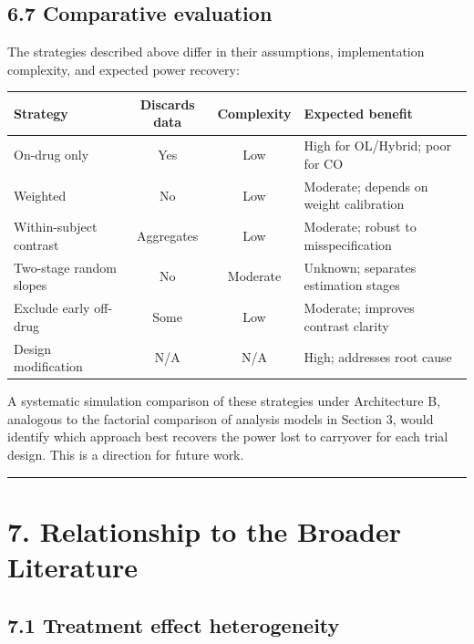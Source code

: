 \documentclass[11pt]{article}
\begin{document}
\subsection{6.7 Comparative evaluation}

The strategies described above differ in their assumptions,
implementation complexity, and expected power recovery:

\begin{table}[htbp]
\centering
\begin{tabular}{lccp{5cm}}
\toprule
Strategy & Discards data & Complexity & Expected benefit \\
\midrule
On-drug only & Yes & Low & High for OL/Hybrid; poor for CO \\
Weighted & No & Low & Moderate; depends on weight calibration \\
Within-subject contrast & Aggregates & Low & Moderate; robust to misspecification \\
Two-stage random slopes & No & Moderate & Unknown; separates estimation stages \\
Exclude early off-drug & Some & Low & Moderate; improves contrast clarity \\
Design modification & N/A & N/A & High; addresses root cause \\
\bottomrule
\end{tabular}
\end{table}

A systematic simulation comparison of these strategies under
Architecture B, analogous to the factorial comparison of analysis
models in Section 3, would identify which approach best recovers
the power lost to carryover for each trial design. This is a
direction for future work.

\bigskip\noindent\rule{\textwidth}{0.4pt}\bigskip

\section{7. Relationship to the Broader Literature}

\subsection{7.1 Treatment effect heterogeneity}
\end{document}
